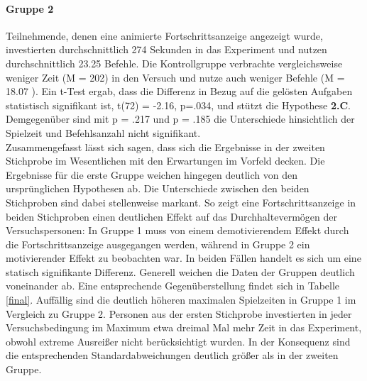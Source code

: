\paragraph{Gruppe 2}
Teilnehmende, denen eine animierte Fortschrittsanzeige angezeigt wurde, investierten durchschnittlich 274 Sekunden in das Experiment und nutzen durchschnittlich 23.25 Befehle. Die Kontrollgruppe verbrachte vergleichsweise weniger Zeit (M = 202) in den Versuch und nutze auch weniger Befehle (M = 18.07 ). Ein t-Test ergab, dass die Differenz in Bezug auf die gelösten Aufgaben statistisch signifikant ist, t(72) = -2.16, p=.034, und stützt die Hypothese \textbf{2.C}. Demgegenüber sind mit p = .217 und p = .185 die Unterschiede hinsichtlich der Spielzeit und Befehlsanzahl nicht signifikant.\\
 
Zusammengefasst lässt sich sagen, dass sich die Ergebnisse in der zweiten Stichprobe im Wesentlichen mit den Erwartungen im Vorfeld decken. Die Ergebnisse für die erste Gruppe weichen hingegen deutlich von den ursprünglichen Hypothesen ab. Die Unterschiede zwischen den beiden Stichproben sind dabei stellenweise markant. So zeigt eine Fortschrittsanzeige in beiden Stichproben einen deutlichen Effekt auf das Durchhaltevermögen der Versuchspersonen: In Gruppe 1 muss von einem demotivierendem Effekt durch die Fortschrittsanzeige ausgegangen werden, während in Gruppe 2 ein motivierender Effekt zu beobachten war. In beiden Fällen handelt es sich um eine statisch signifikante Differenz. Generell weichen die Daten der Gruppen deutlich voneinander ab. Eine entsprechende Gegenüberstellung findet sich in Tabelle \ref{final}. Auffällig sind die deutlich höheren maximalen Spielzeiten in Gruppe 1 im Vergleich zu Gruppe 2. Personen aus der ersten Stichprobe investierten in jeder Versuchsbedingung im Maximum etwa dreimal Mal mehr Zeit in das Experiment, obwohl extreme Ausreißer nicht berücksichtigt wurden. In der Konsequenz sind die entsprechenden Standardabweichungen deutlich größer als in der zweiten Gruppe.


